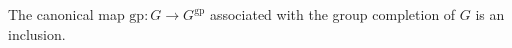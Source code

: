 \documentclass{amsbook} %
\numberwithin{section}{chapter}
\begin{document}
\begin{cor} \label{gpcompin} The canonical map $\mathrm{gp} : G \to G^{\mathrm{gp}}$ associated with the group completion of $G$ is an inclusion.
\end{cor}

%
%
%
%
\end{document}
